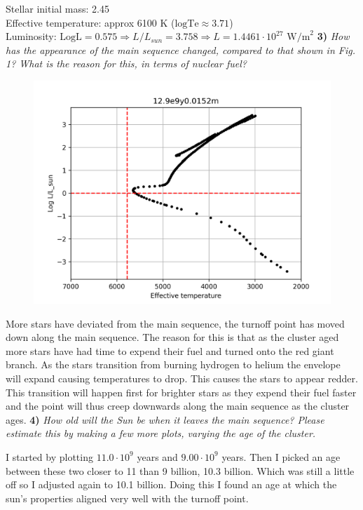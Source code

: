 \documentclass[11pt,a4paper]{article}
\begin{document}
    Stellar initial mass: 2.45 \\
    Effective temperature: approx 6100 K ($\textrm{logTe} \approx 3.71$) \\
    Luminosity: $\textrm{LogL} = 0.575 \Rightarrow L/L_{sun} = 3.758 \Rightarrow L = 1.4461 \cdot 10^{27} \textrm{ W/m}^2$
    \newpage
    \textbf{3)} \textit{How has the appearance of the main sequence changed, compared to that shown in Fig. 1?
    What is the reason for this, in terms of nuclear fuel?}

    \begin{figure}[h]
        \centering
        \includegraphics[width=12cm]{figures/12.9e9y0.0152m}
        \label{fig:ogHR}
    \end{figure}

    More stars have deviated from the main sequence, the turnoff point has moved down along the main sequence.
    The reason for this is that as the cluster aged more stars have had time to expend their fuel and turned onto the red giant branch.
    As the stars transition from burning hydrogen to helium the envelope will expand causing temperatures to drop.
    This causes the stars to appear redder.
    This transition will happen first for brighter stars as they expend their fuel faster and the point will thus creep downwards along the main sequence as the cluster ages.
    \newpage
    \textbf{4)} \textit{How old will the Sun be when it leaves the main sequence?
    Please estimate this by making a few more plots, varying the age of the cluster.}

    I started by plotting $11.0 \cdot 10^9$ years and $9.00 \cdot 10^9$ years.
    Then I picked an age between these two closer to 11 than 9 billion, 10.3 billion.
    Which was still a little off so I adjusted again to 10.1 billion.
    Doing this I found an age at which the sun's properties aligned very well with the turnoff point.
\end{document}
